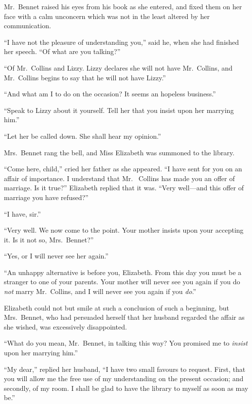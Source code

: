 Mr.\ Bennet raised his eyes from his book as she entered, and
fixed them on her face with a calm unconcern which was not in
the least altered by her communication.

``I have not the pleasure of understanding you,'' said he, when
she had finished her speech.  ``Of what are you talking?''

``Of Mr.\ Collins and Lizzy.  Lizzy declares she will not have
Mr.\ Collins, and Mr.\ Collins begins to say that he will not
have Lizzy.''

``And what am I to do on the occasion?  It seems an hopeless
business.''

``Speak to Lizzy about it yourself.  Tell her that you insist upon
her marrying him.''

``Let her be called down.  She shall hear my opinion.''

Mrs.\ Bennet rang the bell, and Miss Elizabeth was summoned to
the library.

``Come here, child,'' cried her father as she appeared.  ``I have
sent for you on an affair of importance.  I understand that Mr.\ %
Collins has made you an offer of marriage.  Is it true?''  Elizabeth
replied that it was.  ``Very well---and this offer of marriage you
have refused?''

``I have, sir.''

``Very well.  We now come to the point.  Your mother insists
upon your accepting it.  Is it not so, Mrs.\ Bennet?''

``Yes, or I will never see her again.''

``An unhappy alternative is before you, Elizabeth.  From this day
you must be a stranger to one of your parents.  Your mother will
never see you again if you do \emph{not} marry Mr.\ Collins, and I will
never see you again if you \emph{do}.''

Elizabeth could not but smile at such a conclusion of such a
beginning, but Mrs.\ Bennet, who had persuaded herself that her
husband regarded the affair as she wished, was excessively
disappointed.

``What do you mean, Mr.\ Bennet, in talking this way?  You
promised me to \emph{insist} upon her marrying him.''

``My dear,'' replied her husband, ``I have two small favours to
request.  First, that you will allow me the free use of my
understanding on the present occasion; and secondly, of my
room.  I shall be glad to have the library to myself as soon as
may be.''

